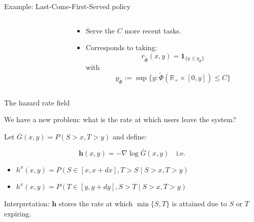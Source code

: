 \documentclass[aspectratio=169]{beamer}
\newcommand{\R}{\mathbb{R}}
\begin{document}
\begin{frame}{Example: Last-Come-First-Served policy}
\begin{columns}
\begin{column}{0.45\textwidth}
		\end{column}
	\begin{column}{0.55\textwidth}
		\begin{itemize}
			\item Serve the $C$ more recent tasks.
			\item Corresponds to taking:
				\begin{equation*}
					r_{\tilde\Phi}(x,y) = \mathbf{1}_{\{y\leqslant y_{\tilde\Phi}\}} 
				\end{equation*}
				with
				\begin{equation*} 
					y_{\tilde\Phi} := \sup\{y: \tilde\Phi(\R_+\times [0, y]) \leqslant C\}
				\end{equation*} 
		\end{itemize}
	\end{column}
\end{columns}

\end{frame}

\begin{frame}{The hazard rate field}

	We have a new problem: what is the rate at which users \alert{leave} the system?

	\pause

	\vfill

	Let $\bar{G}(x,y) = P(S>x,T>y)$ and define:

	\begin{definition}
		\begin{equation*}
			\mathbf{h}(x,y) = -\nabla \log \bar{G}(x,y)	\quad \text{i.e.}
		\end{equation*}
		\begin{itemize}
			\item $h^x (x,y) = P(S\in[x,x+dx],T>S \mid S>x,T>y)$
			\item $h^x (x,y) = P(T\in[y,y+dy],S>T \mid S>x,T>y)$
		\end{itemize}
	\end{definition}

	\vfill

	Interpretation: $\mathbf{h}$ stores the rate at which $\min\{S,T\}$ is attained due to $S$ or $T$ expiring.
\end{frame}
\end{document}
